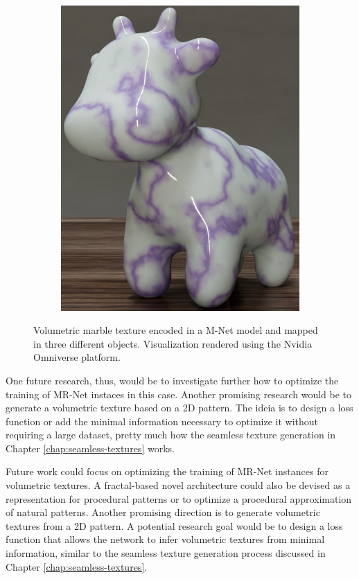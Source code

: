 \begin{figure}[h]
\begin{subfigure}[b]{0.32\textwidth}
       \includegraphics[width=\textwidth]{img/ch7/spot_mrnet.0101.png}
       \caption{}
   \end{subfigure}
   \caption{Volumetric marble texture encoded in a M-Net model and mapped in three different objects. Visualization rendered using the Nvidia Omniverse platform.}
   \label{f:volumetric-texture}
\end{figure}

One future research, thus, would be to investigate further how to optimize the training of MR-Net instaces in this case. Another promising research would be to generate a volumetric texture based on a 2D pattern. The ideia is to design a loss function or add the minimal information necessary to optimize it without requiring a large dataset, pretty much how the seamless texture generation in Chapter \ref{chap:seamless-textures} works.

Future work could focus on optimizing the training of MR-Net instances for volumetric textures. A fractal-based novel architecture could also be devised as a representation for procedural patterns or to optimize a procedural approximation of natural patterns. Another promising direction is to generate volumetric textures from a 2D pattern. A potential research goal would be to design a loss function that allows the network to infer volumetric textures from minimal information, similar to the seamless texture generation process discussed in Chapter \ref{chap:seamless-textures}.

